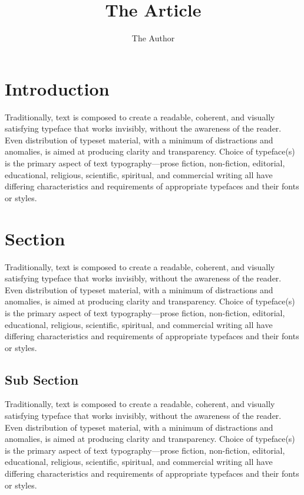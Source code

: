 \documentclass[twoside]{xarticle}
\title{The Article}
\author{The Author}
\date{\relax}
\begin{document}

\thispagestyle{empty}
\maketitle
\tableofcontents

\clearpage

\pagestyle{fancy}

\section{Introduction}
\thispagestyle{empty}

Traditionally, text is composed to create a readable, coherent, and visually
satisfying typeface that works invisibly, without the awareness of the reader.
Even distribution of typeset material, with a minimum of distractions and
anomalies, is aimed at producing clarity and transparency. Choice of typeface(s)
is the primary aspect of text typography—prose fiction, non-fiction, editorial,
educational, religious, scientific, spi\-ritual, and commercial writing all have
differing characteristics and requirements of appropriate typefaces and their
fonts or styles.

\clearpage

\thispagestyle{empty}

\section{Section}

Traditionally, text is composed to create a readable, coherent, and visually
satisfying typeface that works invisibly, without the awareness of the reader.
Even distribution of typeset material, with a minimum of distractions and
anomalies, is aimed at producing clarity and transparency. Choice of typeface(s)
is the primary aspect of text typography—prose fiction, non-fiction, editorial,
educational, religious, scientific, spiritual, and commercial writing all have
differing characteristics and requirements of appropriate typefaces and their
fonts or styles.

\subsection{Sub Section}

Traditionally, text is composed to create a readable, coherent, and visually
satisfying typeface that works invisibly, without the awareness of the reader.
Even distribution of typeset material, with a minimum of distractions and
anomalies, is aimed at producing clarity and transparency. Choice of typeface(s)
is the primary aspect of text typography—prose fiction, non-fiction, editorial,
educational, religious, scientific, spiritual, and commercial writing all have
differing characteristics and requirements of appropriate typefaces and their
fonts or styles.
\end{document}
